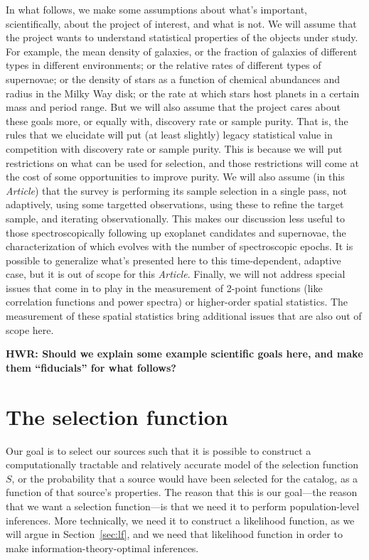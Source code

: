 \documentclass[modern]{aastex62}
\newcommand{\documentname}{\textsl{Article}}
\newcommand{\sectionname}{Section}
\begin{document}
In what follows, we make some assumptions about what's important,
scientifically, about the project of interest, and what is not.
We will assume that the project wants to understand statistical properties
of the objects under study.
For example, the mean density of galaxies, or the fraction of galaxies
of different types in different environments;
or the relative rates of different types of supernovae;
or the density of stars as a function of chemical abundances and radius in the Milky Way disk;
or the rate at which stars host planets in a certain mass and period range.
But we will also assume that the project cares about these goals more,
or equally with, discovery rate or sample purity.
That is, the rules that we elucidate will put (at least slightly)
legacy statistical value in competition with discovery rate or sample
purity.
This is because we will put restrictions on what can be used for
selection, and those restrictions will come at the cost of some
opportunities to improve purity.
We will also assume (in this \documentname) that the survey is performing
its sample selection in a single pass, not adaptively, using some
targetted observations, using these to refine the target sample, and
iterating observationally.
This makes our discussion less useful to those spectroscopically following up exoplanet
candidates and supernovae, the characterization of which evolves with
the number of spectroscopic epochs.
It is possible to generalize what's presented here to this time-dependent, adaptive
case, but it is out of scope for this \documentname.
Finally, we will not address special issues that come in to play in the
measurement of 2-point functions (like correlation functions and power
spectra) or higher-order spatial statistics.
The measurement of these spatial statistics bring additional issues
that are also out of scope here.

\textbf{HWR: Should we explain some example scientific goals here, and make
them ``fiducials'' for what follows?}

\section{The selection function}\label{sec:sf}

Our goal is to select our sources such that it is possible to
construct a computationally tractable and relatively accurate model of
the selection function $S$, or the probability that a source would have
been selected for the catalog, as a function of that source's properties.
The reason that this is our goal---the reason that we want a selection
function---is that we need it to perform population-level inferences.
More technically, we need it to construct a likelihood function, as we
will argue in \sectionname~\ref{sec:lf}, and we need that likelihood
function in order to make information-theory-optimal inferences.
\end{document}
